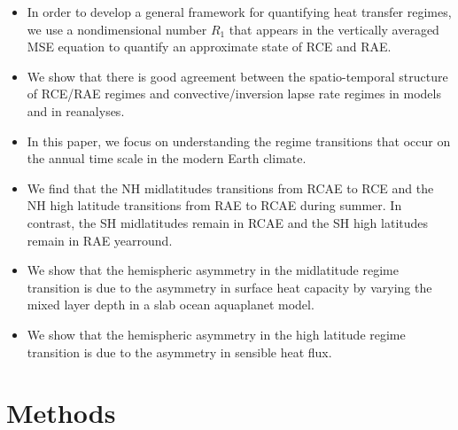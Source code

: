 \documentclass{ametsocV5}
\begin{document}
\begin{itemize}
  \item In order to develop a general framework for quantifying heat transfer regimes, we use a nondimensional number \(R_{1}\) that appears in the vertically averaged MSE equation to quantify an approximate state of RCE and RAE.
  \item We show that there is good agreement between the spatio-temporal structure of RCE/RAE regimes and convective/inversion lapse rate regimes in models and in reanalyses.
  \item In this paper, we focus on understanding the regime transitions that occur on the annual time scale in the modern Earth climate.
  \item We find that the NH midlatitudes transitions from RCAE to RCE and the NH high latitude transitions from RAE to RCAE during summer. In contrast, the SH midlatitudes remain in RCAE and the SH high latitudes remain in RAE yearround.
  \item We show that the hemispheric asymmetry in the midlatitude regime transition is due to the asymmetry in surface heat capacity by varying the mixed layer depth in a slab ocean aquaplanet model.
  \item We show that the hemispheric asymmetry in the high latitude regime transition is due to the asymmetry in sensible heat flux.
\end{itemize}

\section{Methods}
\end{document}
